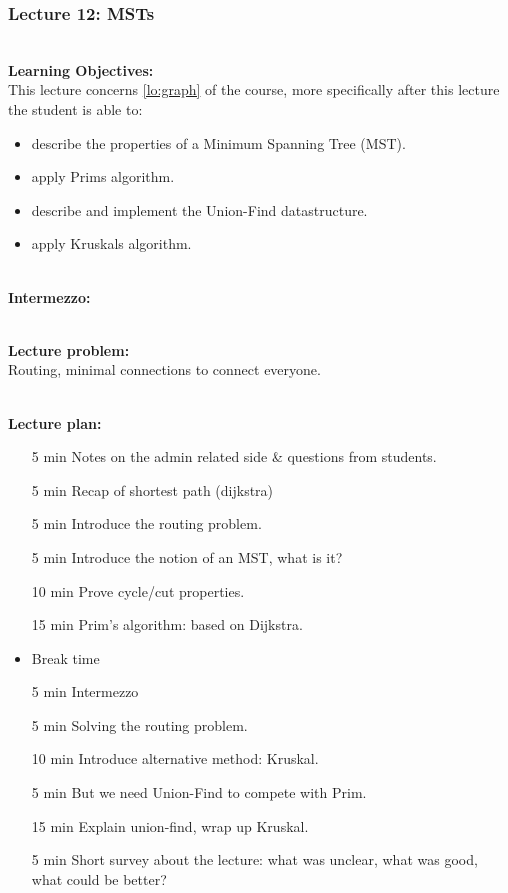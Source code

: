 \newpage
\subsubsection{Lecture 12: MSTs}
\label{sub:lecture_12}

\hfill\\
\textbf{Learning Objectives:}\\
This lecture concerns \cref{lo:graph} of the course, more specifically after this lecture the student is able
to:
\begin{itemize}
	\item describe the properties of a Minimum Spanning Tree (MST).
	\item apply Prims algorithm.
	\item describe and implement the Union-Find datastructure.
	\item apply Kruskals algorithm.
\end{itemize}

\hfill\\
\textbf{Intermezzo:}\\

\hfill\\
\textbf{Lecture problem:}\\
Routing, minimal connections to connect everyone.

\hfill\\
\textbf{Lecture plan:}\\
\begin{itemize}
	\item[5 min] Notes on the admin related side \& questions from students.
	\item[5 min] Recap of shortest path (dijkstra)
	\item[5 min] Introduce the routing problem.
	\item[5 min] Introduce the notion of an MST, what is it?
	\item[10 min] Prove cycle/cut properties.
	\item[15 min] Prim's algorithm: based on Dijkstra. 
	\item Break time
	\item[5 min] Intermezzo
	\item[5 min] Solving the routing problem.
	\item[10 min] Introduce alternative method: Kruskal.
	\item[5 min] But we need Union-Find to compete with Prim.
	\item[15 min] Explain union-find, wrap up Kruskal.
	\item[5 min] Short survey about the lecture: what was unclear, what was good, what could be better?
\end{itemize}

